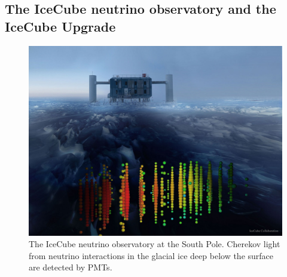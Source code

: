 \documentclass[a4paper,11pt]{article}
\begin{document}




\subsection{The IceCube neutrino observatory and the IceCube Upgrade}

\begin{figure} %
    \centering
	\includegraphics[width=1.\linewidth]{images/IceCube_1200x.jpg}
	\caption{The IceCube neutrino observatory at the South Pole. Cherekov light from neutrino interactions in the glacial ice deep below the surface are detected by PMTs.}
	\label{fig:atmo_osc}
\end{figure}
\end{document}
